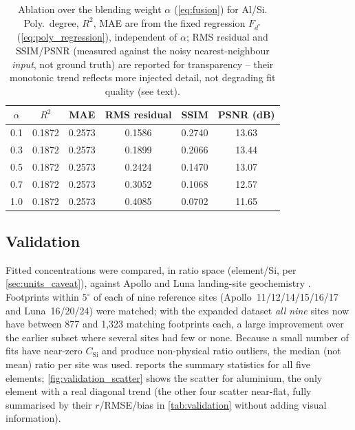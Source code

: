 \documentclass[journal,lettersize]{IEEEtran}
\begin{document}
\begin{table}[!t]
  \centering
  \caption{Ablation over the blending weight $\alpha$ (\cref{eq:fusion})
    for Al/Si. Poly.\ degree, $R^2$, MAE are from the fixed regression
    $F_{d^*}$ (\cref{eq:poly_regression}), independent of $\alpha$; RMS
    residual and SSIM/PSNR (measured against the noisy nearest-neighbour
    \emph{input}, not ground truth) are reported for transparency -- their
    monotonic trend reflects more injected detail, not degrading fit
    quality (see text).}
  \label{tab:ablation}
  \begin{tabular}{cccccc}
    \toprule
    $\alpha$ & $R^2$ & MAE & RMS residual & SSIM & PSNR (dB) \\
    \midrule
    0.1 & 0.1872 & 0.2573 & 0.1586 & 0.2740 & 13.63 \\
    0.3 & 0.1872 & 0.2573 & 0.1899 & 0.2066 & 13.44 \\
    0.5 & 0.1872 & 0.2573 & 0.2424 & 0.1470 & 13.07 \\
    0.7 & 0.1872 & 0.2573 & 0.3052 & 0.1068 & 12.57 \\
    1.0 & 0.1872 & 0.2573 & 0.4085 & 0.0702 & 11.65 \\
    \bottomrule
  \end{tabular}
\end{table}

\subsection{Validation}\label{sec:validation}

Fitted concentrations were compared, in ratio space (element/Si, per
\cref{sec:units_caveat}), against Apollo and Luna landing-site
geochemistry \cite{LSC}. Footprints within $5^{\circ}$ of each of nine
reference sites (Apollo~11/12/14/15/16/17 and Luna~16/20/24) were matched;
with the expanded dataset \emph{all nine} sites now have between 877 and
1{,}323 matching footprints each, a large improvement over the earlier
subset where several sites had few or none. Because a small number of fits
have near-zero $C_{\mathrm{Si}}$ and produce non-physical ratio outliers,
the median (not mean) ratio per site was used.
 reports the summary statistics for all five
elements; \cref{fig:validation_scatter} shows the scatter for aluminium,
the only element with a real diagonal trend (the other four scatter
near-flat, fully summarised by their $r$/RMSE/bias in \cref{tab:validation}
without adding visual information).
\end{document}
